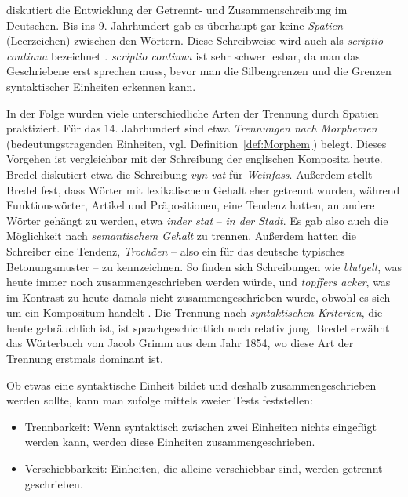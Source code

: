 \citet{Bredel2006} diskutiert die Entwicklung der Getrennt- und Zusammenschreibung im Deutschen. Bis ins 9. Jahrhundert gab es überhaupt gar keine \textit{Spatien} (Leerzeichen) zwischen den Wörtern. Diese Schreibweise wird auch als \textit{scriptio continua} bezeichnet \citep[141]{Bredel2006}. \textit{scriptio continua} ist sehr schwer lesbar, da man das Geschriebene erst sprechen muss, bevor man die Silbengrenzen und die Grenzen syntaktischer Einheiten erkennen kann.

In der Folge wurden viele unterschiedliche Arten der Trennung durch Spatien praktiziert. Für das 14. Jahrhundert sind etwa \textit{Trennungen nach Morphemen} (bedeutungstragenden Einheiten, vgl. Definition~\ref{def:Morphem}) belegt. Dieses Vorgehen ist vergleichbar mit der Schreibung der englischen Komposita heute. Bredel diskutiert etwa die Schreibung \textit{vyn vat} für \textit{Weinfass}. Außerdem stellt Bredel fest, dass Wörter mit lexikalischem Gehalt eher getrennt wurden, während Funktionswörter, \zB Artikel und Präpositionen, eine Tendenz hatten, an andere Wörter gehängt zu werden, etwa \textit{inder stat} -- \textit{in der Stadt}. Es gab also auch die Möglichkeit nach \textit{semantischem Gehalt} zu trennen. Außerdem hatten die Schreiber eine Tendenz, \textit{Trochäen} -- also ein für das deutsche typisches Betonungsmuster -- zu kennzeichnen. So finden sich Schreibungen wie \textit{blutgelt}, was heute immer noch zusammengeschrieben werden würde, und \textit{topffers acker}, was im Kontrast zu heute damals nicht zusammengeschrieben wurde, obwohl es sich um ein Kompositum handelt \citep[144]{Bredel2006}. Die Trennung nach \textit{syntaktischen Kriterien}, die heute gebräuchlich ist, ist sprachgeschichtlich noch relativ jung. Bredel erwähnt das Wörterbuch von Jacob Grimm aus dem Jahr 1854, wo diese Art der Trennung erstmals dominant ist. 

Ob etwas eine syntaktische Einheit bildet und deshalb zusammengeschrieben werden sollte, kann man \citet[257]{FuhrhopPeters2013} zufolge mittels zweier Tests feststellen:

\begin{itemize}
    \item Trennbarkeit: Wenn syntaktisch zwischen zwei Einheiten nichts eingefügt werden kann, werden diese Einheiten zusammengeschrieben.
    \item Verschiebbarkeit: Einheiten, die alleine verschiebbar sind, werden getrennt geschrieben.
\end{itemize}

